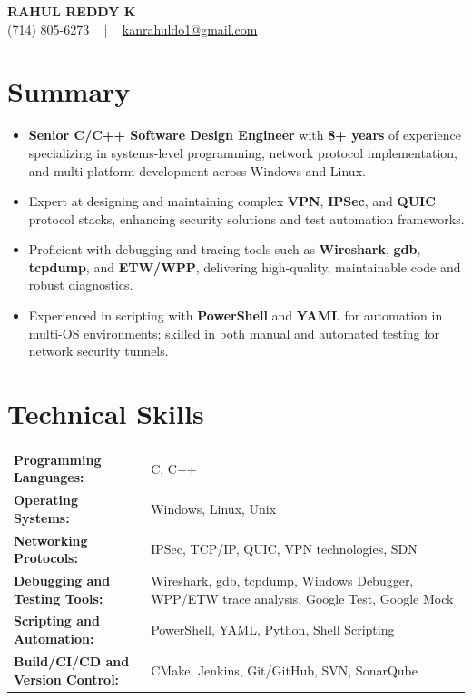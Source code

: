 \documentclass[letterpaper,11pt]{article}
\newcommand{\resumeItem}[1]{
  \item\footnotesize{
    {#1 \vspace{-2pt}}
  }
}
\newcommand{\resumeItemListStart}{\begin{itemize}[leftmargin=*]}
\newcommand{\resumeItemListEnd}{\end{itemize}\vspace{-5pt}}
\begin{document}
\begin{center}
    {\fontsize{14pt}{12pt}\selectfont \textbf{\MakeUppercase{Rahul Reddy K}}}\\ \vspace{2pt}
    \fontsize{10pt}{12pt}\selectfont (714) 805-6273 ~ | ~ \href{mailto:kanrahuldo1@gmail.com}{kanrahuldo1@gmail.com}~
    \vspace{-8pt}
\end{center}

\section{Summary}
\fontsize{9pt}{10pt}\selectfont
\resumeItemListStart
    \resumeItem{\textbf{Senior C/C++ Software Design Engineer} with \textbf{8+ years} of experience specializing in systems-level programming, network protocol implementation, and multi-platform development across Windows and Linux.}
    \resumeItem{Expert at designing and maintaining complex \textbf{VPN}, \textbf{IPSec}, and \textbf{QUIC} protocol stacks, enhancing security solutions and test automation frameworks.}
    \resumeItem{Proficient with debugging and tracing tools such as \textbf{Wireshark}, \textbf{gdb}, \textbf{tcpdump}, and \textbf{ETW/WPP}, delivering high-quality, maintainable code and robust diagnostics.}
    \resumeItem{Experienced in scripting with \textbf{PowerShell} and \textbf{YAML} for automation in multi-OS environments; skilled in both manual and automated testing for network security tunnels.}
\resumeItemListEnd
\vspace{-6pt}

\section{Technical Skills}
        \vspace{-14pt}
        \begin{table}[h]
            \fontsize{9pt}{10pt}\selectfont
            \begin{tabular}{p{0.3\linewidth} p{0.7\linewidth}}
                \textbf{Programming Languages:} & C, C++ \\
                \textbf{Operating Systems:} & Windows, Linux, Unix \\
                \textbf{Networking Protocols:} & IPSec, TCP/IP, QUIC, VPN technologies, SDN \\
                \textbf{Debugging and Testing Tools:} & Wireshark, gdb, tcpdump, Windows Debugger, WPP/ETW trace analysis, Google Test, Google Mock \\
                \textbf{Scripting and Automation:} & PowerShell, YAML, Python, Shell Scripting \\
                \textbf{Build/CI/CD and Version Control:} & CMake, Jenkins, Git/GitHub, SVN, SonarQube \\
            \end{tabular}
        \end{table}
    \vspace{-15pt}
\end{document}
